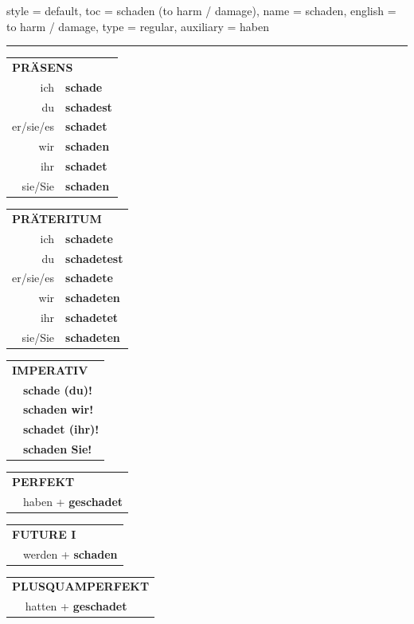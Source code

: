 \begin{verbentry}{
  style = {default},
  toc = {schaden (to harm / damage)},
  name = {schaden},
  english = {to harm / damage},
  type = {regular},
  auxiliary = {haben}
}


\vspace{5pt}
\hrule
\vspace{5pt}

\begin{tabular}{rl}
\multicolumn{2}{l}{\textbf{PRÄSENS}}\\
ich & \textbf{schade}\\
du & \textbf{schadest}\\
er/sie/es & \textbf{schadet}\\
wir & \textbf{schaden}\\
ihr & \textbf{schadet}\\
sie/Sie & \textbf{schaden}\\
\end{tabular}
\hfill
\begin{tabular}{rl}
\multicolumn{2}{l}{\textbf{PRÄTERITUM}}\\
ich & \textbf{schadete}\\
du & \textbf{schadetest}\\
er/sie/es & \textbf{schadete}\\
wir & \textbf{schadeten}\\
ihr & \textbf{schadetet}\\
sie/Sie & \textbf{schadeten}\\
\end{tabular}
\hfill
\begin{tabular}{rl}
\multicolumn{2}{l}{\textbf{IMPERATIV}}\\
& \textbf{schade (du)!}\\
& \textbf{schaden wir!}\\
& \textbf{schadet (ihr)!}\\
& \textbf{schaden Sie!}\\
\end{tabular}

\vspace{10pt}

\begin{tabular}{rl}
\multicolumn{2}{l}{\textbf{PERFEKT}}\\
& haben + \textbf{geschadet}\\
\end{tabular}
\hfill
\begin{tabular}{rl}
\multicolumn{2}{l}{\textbf{FUTURE I}}\\
& werden + \textbf{schaden}\\
\end{tabular}
\hfill
\begin{tabular}{rl}
\multicolumn{2}{l}{\textbf{PLUSQUAMPERFEKT}}\\
& hatten + \textbf{geschadet}\\
\end{tabular}


\end{verbentry}

